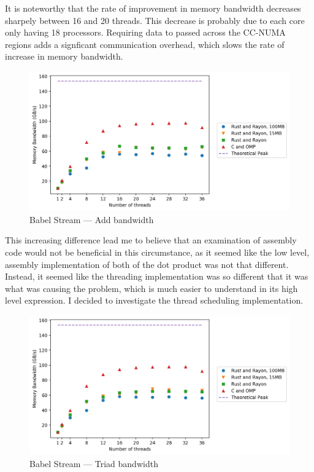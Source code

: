 It is noteworthy that the rate of improvement in memory bandwidth decreases sharpely between 16 and 20 threads. This decrease is probably due to each core only having 18 processors. Requiring data to passed across the CC-NUMA regions adds a signficant communication overhead, which slows the rate of increase in memory bandwidth.
\begin{figure}[h]
\centering
\includegraphics[width=.9\linewidth]{figs/babel/Add.png}
\caption{Babel Stream --- Add bandwidth}\label{fig:babel-add}
\end{figure}

This increasing difference lead me to believe that an examination of assembly code would not be beneficial in this circumstance, as it seemed like the low level, assembly implementation of both of the dot product was not that different. Instead, it seemed like the threading implementation was so different that it was what was causing the problem, which is much easier to understand in its high level expression. I decided to investigate the thread scheduling implementation.

\begin{figure}[h]
\centering
\includegraphics[width=.9\linewidth]{figs/babel/Triad.png}
\caption{Babel Stream --- Triad bandwidth}\label{fig:babel-triad}
\end{figure}

